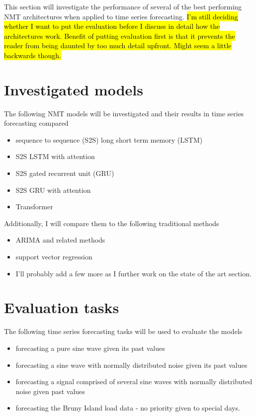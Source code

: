 \par
This section will investigate the performance of several of the best performing NMT architectures when applied to time series forecasting.
\hl{I'm still deciding whether I want to put the evaluation before I discuss in detail how the architectures work.
	Benefit of putting evaluation first is that it prevents the reader from being daunted by too much detail upfront.
	Might seem a little backwards though.}

\section{Investigated models}
The following NMT models will be investigated and their results in time series forecasting compared
\begin{itemize}
	\item sequence to sequence (S2S) \citep{Cho2014a} long short term memory (LSTM) \citep{hochreiter1997long}
	\item S2S LSTM with attention \citep{luong2015effective}
	\item S2S gated recurrent unit (GRU) \citep{Cho2014a}
	\item S2S GRU with attention
	\item Transformer \citep{Vaswani2017}
\end{itemize}

Additionally, I will compare them to the following traditional methods
\begin{itemize}
	\item ARIMA and related methods
	\item support vector regression
	\item I'll probably add a few more as I further work on the state of the art section.
\end{itemize}

\section{Evaluation tasks}
The following time series forecasting tasks will be used to evaluate the models
\begin{itemize}
	\item forecasting a pure sine wave given its past values
	\item forecasting a sine wave with normally distributed noise given its past values
	\item forecasting a signal comprised of several sine waves with normally distributed noise given past values
	\item forecasting the Bruny Island load data - no priority given to special days.
\end{itemize}


